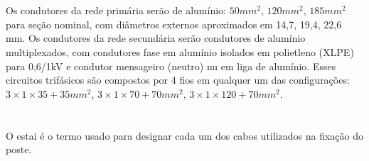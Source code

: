\documentclass{article}
\begin{document}
\section{}
Os condutores da rede primária serão de alumínio: $50mm^2$, $120mm^2$, $185mm^2$ para seção nominal, com diâmetros externos aproximados em 14,7, 19,4, 22,6 mm. Os condutores da rede secundária serão condutores de alumínio multiplexados, com condutores fase em alumínio isolados em polietleno (XLPE) para 0,6/1kV e condutor mensageiro (neutro) nu em liga de alumínio. Esses circuitos trifásicos são compostos por 4 fios em qualquer um das configurações: $3\times1\times35 + 35mm^2$, $3\times1\times70 + 70 mm^2$, $3\times1\times120 + 70mm^2$.
\section{}
O estai é o termo usado para designar cada um dos cabos utilizados na fixação do poste.
\end{document}
